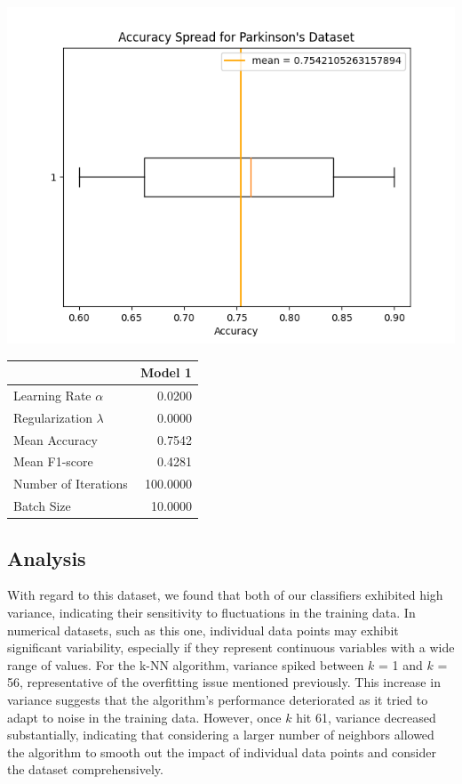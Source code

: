 \documentclass{article}
\begin{document}
\begin{minipage}{0.49\textwidth}
    \centering
    \includegraphics*[width=\textwidth]{./src/figures/Parkinson's Dataset_variant.png}
\end{minipage}
\hfill
\begin{minipage}{0.49\textwidth}
    \centering
    \begin{tabular}{lr}
        \toprule
         & Model 1 \\
        \midrule
        Learning Rate $\alpha$ & 0.0200 \\
        Regularization $\lambda$ & 0.0000 \\
        Mean Accuracy & 0.7542 \\
        Mean F1-score & 0.4281 \\
        Number of Iterations & 100.0000 \\
        Batch Size & 10.0000 \\
        \bottomrule
        \end{tabular}
\end{minipage}

\subsection*{Analysis}
With regard to this dataset, we found that both of our classifiers exhibited high variance, 
indicating their sensitivity to fluctuations in the training data.
In numerical datasets, such as this one, individual data points may exhibit significant variability, 
especially if they represent continuous variables with a wide range of values.
For the k-NN algorithm, variance spiked between $k$ = 1 and $k$ = 56,
representative of the overfitting issue mentioned previously.
This increase in variance suggests that the algorithm's performance deteriorated
as it tried to adapt to noise in the training data.
However, once $k$ hit 61, variance decreased substantially, 
indicating that considering a larger number of neighbors allowed the algorithm 
to smooth out the impact of individual data points and consider the dataset comprehensively.
\\
\end{document}
